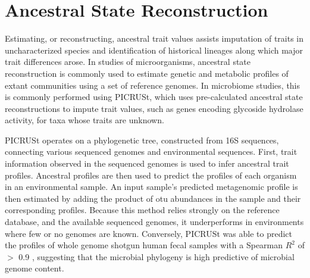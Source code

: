 \section{Ancestral State Reconstruction}
Estimating, or reconstructing, ancestral trait values assists imputation of traits in uncharacterized species and identification of historical lineages along which major trait differences arose. In studies of microorganisms, ancestral state reconstruction is commonly used to estimate genetic and metabolic profiles of extant communities using a set of reference genomes. In microbiome studies, this is commonly performed using PICRUSt\cite{picrust}, which uses pre-calculated ancestral state reconstructions to impute trait values, such as genes encoding glycoside hydrolase activity, for taxa whose traits are unknown.\par
PICRUSt operates on a phylogenetic tree, constructed from 16S sequences, connecting various sequenced genomes and environmental sequences. First, trait information observed in the sequenced genomes is used to infer ancestral trait profiles. Ancestral profiles are then used to predict the profiles of each organism in an environmental sample. An input sample's predicted metagenomic profile is then estimated by adding the product of \gls{otu} abundances in the sample and their corresponding profiles. Because this method relies strongly on the reference database, and the available sequenced genomes, it underperforms in environments where few or no genomes are known. Conversely, PICRUSt was able to predict the profiles of whole genome shotgun human fecal samples with a Spearman $R^2$ of $>$ 0.9 \cite{picrust}, suggesting that the microbial phylogeny is high predictive of microbial genome content.\par
